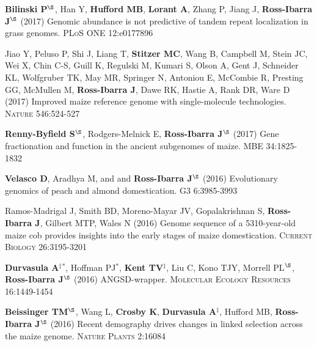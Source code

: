 \documentclass[letterpaper,10pt]{article}
\begin{document}
\begin{etaremune}
\item {\bf Bilinski P}$^\S$, Han Y, {\bf Hufford MB}, {\bf Lorant A}, Zhang P, Jiang J, {\bf Ross-Ibarra J}$^\S$ (2017) Genomic abundance is not predictive of tandem repeat localization in grass genomes. \textsc{PLoS ONE} 12:e0177896

\item  Jiao Y, Peluso P,  Shi J,  Liang T, {\bf Stitzer MC}, Wang B,  Campbell M, Stein JC,  Wei X,  Chin C-S,  Guill K,  Regulski M,  Kumari S,  Olson A,  Gent J, Schneider KL,  Wolfgruber TK, May MR, Springer N,  Antoniou E,  McCombie R, Presting GG,  McMullen M, {\bf Ross-Ibarra J}, Dawe RK,  Hastie A, Rank DR, Ware D (2017) Improved maize reference genome with single-molecule technologies. \textsc{Nature}  546:524-527

\item  {\bf Renny-Byfield S}$^\S$, Rodgers-Melnick E, {\bf Ross-Ibarra J}$^\S$ (2017) Gene fractionation and function in the ancient subgenomes of maize. \textsc{MBE} 34:1825-1832

\item {\bf Velasco D}, Aradhya M, and  and {\bf Ross-Ibarra J}$^\S$ (2016) Evolutionary genomics of peach and almond domestication. \textsc{G3} 6:3985-3993

\item Ramos-Madrigal J, Smith BD, Moreno-Mayar JV, Gopalakrishnan S, {\bf Ross-Ibarra J}, Gilbert MTP, Wales N (2016) Genome sequence of a 5310-year-old maize cob provides insights into the early stages of maize domestication. \textsc{Current Biology} 26:3195-3201

\item {\bf Durvasula A}$^\ddagger$$^*$,  Hoffman PJ$^*$, {\bf Kent TV}$^\ddagger$, Liu C, Kono TJY, Morrell PL$^\S$, {\bf Ross-Ibarra J}$^\S$ (2016) ANGSD-wrapper. \textsc{Molecular Ecology Resources} 16:1449-1454

\item {\bf Beissinger TM}$^\S$, Wang L, {\bf Crosby K}, {\bf Durvasula A}$^\ddagger$, Hufford MB, {\bf Ross-Ibarra J}$^\S$ (2016)  Recent demography drives changes in linked selection across the maize genome. \textsc{Nature Plants} 2:16084


\end{etaremune}
\end{document}
